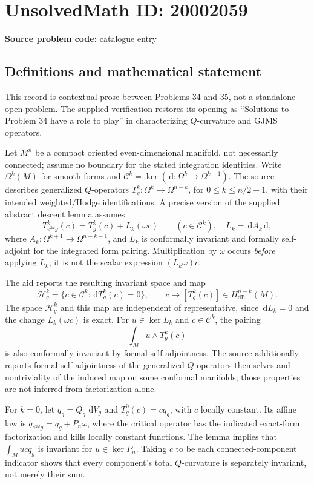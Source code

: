 \documentclass[11pt]{article}
\newcommand{\dd}{\,\mathrm{d}}
\begin{document}
\section*{UnsolvedMath ID: 20002059}
\textbf{Source problem code:} catalogue entry
\subsection{Definitions and mathematical statement}
This record is contextual prose between Problems 34 and 35, not a standalone open problem. The supplied verification restores its opening as ``Solutions to Problem 34 have a role to play'' in characterizing \(Q\)-curvature and GJMS operators.

Let \(M^n\) be a compact oriented even-dimensional manifold, not necessarily connected; assume no boundary for the stated integration identities. Write \(\Omega^k(M)\) for smooth forms and \(\mathcal C^k=\ker(\dd:\Omega^k\to\Omega^{k+1})\). The source describes generalized \(Q\)-operators \(T_g^k:\Omega^k\to\Omega^{n-k}\), for \(0\leq k\leq n/2-1\), with their intended weighted/Hodge identifications. A precise version of the supplied abstract descent lemma assumes
\[
T_{e^{2\omega}g}^k(c)=T_g^k(c)+L_k(\omega c)\qquad(c\in\mathcal C^k),
\quad L_k=\dd A_k\dd,
\]
where \(A_k:\Omega^{k+1}\to\Omega^{n-k-1}\), and \(L_k\) is conformally invariant and formally self-adjoint for the integrated form pairing. Multiplication by \(\omega\) occurs \emph{before} applying \(L_k\); it is not the scalar expression \((L_k\omega)c\).

The aid reports the resulting invariant space and map
\[
\mathcal H_g^k=\{c\in\mathcal C^k:\dd T_g^k(c)=0\},\qquad
c\longmapsto[T_g^k(c)]\in H_{\mathrm{dR}}^{n-k}(M).
\]
The space \(\mathcal H_g^k\) and this map are independent of representative, since \(\dd L_k=0\) and the change \(L_k(\omega c)\) is exact. For \(u\in\ker L_k\) and \(c\in\mathcal C^k\), the pairing
\[
\int_Mu\wedge T_g^k(c)
\]
is also conformally invariant by formal self-adjointness. The source additionally reports formal self-adjointness of the generalized \(Q\)-operators themselves and nontriviality of the induced map on some conformal manifolds; those properties are not inferred from factorization alone.

For \(k=0\), let \(q_g=Q_g\,\dd V_g\) and \(T_g^0(c)=c q_g\), with \(c\) locally constant. Its affine law is \(q_{e^{2\omega}g}=q_g+P_n\omega\), where the critical operator has the indicated exact-form factorization and kills locally constant functions. The lemma implies that \(\int_Mu c q_g\) is invariant for \(u\in\ker P_n\). Taking \(c\) to be each connected-component indicator shows that every component's total \(Q\)-curvature is separately invariant, not merely their sum.
\end{document}
